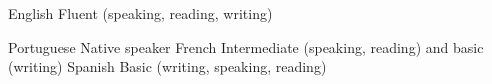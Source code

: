 

\begin{cvskills}

  \cvskill
    {English} %
    {Fluent (speaking, reading, writing)} %

  \cvskill
    {Portuguese} %
    {Native speaker} %
  \cvskill
    {French} %
    {Intermediate (speaking, reading) and basic (writing)} %
  \cvskill
    {Spanish} %
    {Basic (writing, speaking, reading)} %
\end{cvskills}